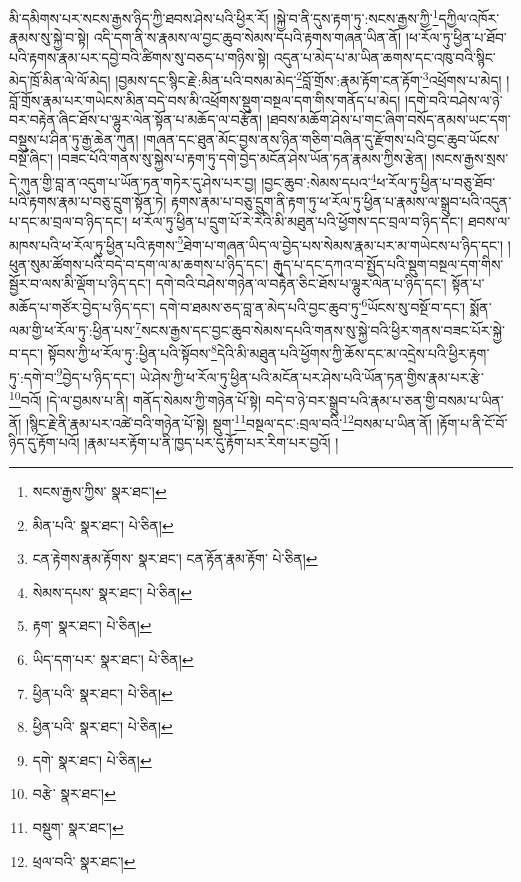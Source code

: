 མི་དམིགས་པར་སངས་རྒྱས་ཉིད་ཀྱི་ཐབས་ཤེས་པའི་ཕྱིར་རོ། །སྐྱེ་བ་ནི་དུས་རྟག་ཏུ་:སངས་རྒྱས་ཀྱི་\footnote{སངས་རྒྱས་ཀྱིས་  སྣར་ཐང་། }དཀྱིལ་འཁོར་རྣམས་སུ་སྐྱེ་བ་སྟེ། འདི་དག་ནི་ས་རྣམས་ལ་བྱང་ཆུབ་སེམས་དཔའི་རྟགས་གཞན་ཡིན་ནོ། །ཕ་རོལ་ཏུ་ཕྱིན་པ་ཐོབ་པའི་རྟགས་རྣམ་པར་དབྱེ་བའི་ཚིགས་སུ་བཅད་པ་གཉིས་སྟེ། འདུན་པ་མེད་པ་མ་ཡིན་ཆགས་དང་འཁུ་བའི་སྙིང་མེད་ཁྲོ་མིན་ལེ་ལོ་མེད། །བྱམས་དང་སྙིང་རྗེ་:མིན་པའི་བསམ་མེད་\footnote{མིན་པའི་  སྣར་ཐང་།  པེ་ཅིན། }བློ་གྲོས་:རྣམ་རྟོག་ངན་རྟོག་\footnote{ངན་རྟེགས་རྣམ་རྟོགས་  སྣར་ཐང་། ངན་རྟོན་རྣམ་རྟོག་  པེ་ཅིན། }འཕྲོགས་པ་མེད། །བློ་གྲོས་རྣམ་པར་གཡེངས་མིན་བདེ་བས་མི་འཕྲོགས་སྡུག་བསྔལ་དག་གིས་གནོད་པ་མེད། །དགེ་བའི་བཤེས་ལ་ཉེ་བར་བརྟེན་ཞིང་ཐོས་པ་ལྷུར་ལེན་སྟོན་པ་མཆོད་ལ་བརྩོན། །ཐབས་མཆོག་ཤེས་པ་གང་ཞིག་བསོད་ནམས་ཡང་དག་བསྡུས་པ་ཤིན་ཏུ་རྒྱ་ཆེན་ཀུན། །གཞན་དང་ཐུན་མོང་བྱས་ནས་ཉིན་གཅིག་བཞིན་དུ་རྫོགས་པའི་བྱང་ཆུབ་ཡོངས་བསྔོ་ཞིང་། །བཟང་པོའི་གནས་སུ་སྐྱེས་པ་རྟག་ཏུ་དགེ་བྱེད་མངོན་ཤེས་ཡོན་ཏན་རྣམས་ཀྱིས་རྩེན། །སངས་རྒྱས་སྲས་དེ་ཀུན་གྱི་བླ་ན་འདུག་པ་ཡོན་ཏན་གཏེར་དུ་ཤེས་པར་བྱ། །བྱང་ཆུབ་:སེམས་དཔའ་\footnote{སེམས་དཔས་  སྣར་ཐང་།  པེ་ཅིན། }ཕ་རོལ་ཏུ་ཕྱིན་པ་བཅུ་ཐོབ་པའི་རྟགས་རྣམ་པ་བཅུ་དྲུག་སྟོན་ཏེ། རྟགས་རྣམ་པ་བཅུ་དྲུག་ནི་རྟག་ཏུ་ཕ་རོལ་ཏུ་ཕྱིན་པ་རྣམས་ལ་སྒྲུབ་པའི་འདུན་པ་དང་མ་བྲལ་བ་ཉིད་དང་། ཕ་རོལ་ཏུ་ཕྱིན་པ་དྲུག་པོ་རེ་རེའི་མི་མཐུན་པའི་ཕྱོགས་དང་བྲལ་བ་ཉིད་དང་། ཐབས་ལ་མཁས་པའི་ཕ་རོལ་ཏུ་ཕྱིན་པའི་རྟགས་\footnote{རྟག་  སྣར་ཐང་།  པེ་ཅིན། }ཐེག་པ་གཞན་ཡིད་ལ་བྱེད་པས་སེམས་རྣམ་པར་མ་གཡེངས་པ་ཉིད་དང་། །ཕུན་སུམ་ཚོགས་པའི་བདེ་བ་དག་ལ་མ་ཆགས་པ་ཉིད་དང་། རྒུད་པ་དང་དཀའ་བ་སྤྱོད་པའི་སྡུག་བསྔལ་དག་གིས་སྦྱོར་བ་ལས་མི་ལྡོག་པ་ཉིད་དང་། དགེ་བའི་བཤེས་གཉེན་ལ་བརྟེན་ཅིང་ཐོས་པ་ལྷུར་ལེན་པ་ཉིད་དང་། སྟོན་པ་མཆོད་པ་གཙོར་བྱེད་པ་ཉིད་དང་། དགེ་བ་ཐམས་ཅད་བླ་ན་མེད་པའི་བྱང་ཆུབ་ཏུ་\footnote{ཡིད་དག་པར་  སྣར་ཐང་།  པེ་ཅིན། }ཡོངས་སུ་བསྔོ་བ་དང་། སྨོན་ལམ་གྱི་ཕ་རོལ་ཏུ་:ཕྱིན་པས་\footnote{ཕྱིན་པའི་  སྣར་ཐང་།  པེ་ཅིན། }སངས་རྒྱས་དང་བྱང་ཆུབ་སེམས་དཔའི་གནས་སུ་སྐྱེ་བའི་ཕྱིར་གནས་བཟང་པོར་སྐྱེ་བ་དང་། སྟོབས་ཀྱི་ཕ་རོལ་ཏུ་:ཕྱིན་པའི་སྟོབས་\footnote{ཕྱིན་པའི་  སྣར་ཐང་།  པེ་ཅིན། }དེའི་མི་མཐུན་པའི་ཕྱོགས་ཀྱི་ཆོས་དང་མ་འདྲེས་པའི་ཕྱིར་རྟག་ཏུ་:དགེ་བ་\footnote{དགེ་  སྣར་ཐང་།  པེ་ཅིན། }བྱེད་པ་ཉིད་དང་། ཡེ་ཤེས་ཀྱི་ཕ་རོལ་ཏུ་ཕྱིན་པའི་མངོན་པར་ཤེས་པའི་ཡོན་ཏན་གྱིས་རྣམ་པར་རྩེ་\footnote{བརྩེ་  སྣར་ཐང་། }བའོ། །དེ་ལ་བྱམས་པ་ནི། གནོད་སེམས་ཀྱི་གཉེན་པོ་སྟེ། བདེ་བ་ཉེ་བར་སྒྲུབ་པའི་རྣམ་པ་ཅན་གྱི་བསམ་པ་ཡིན་ནོ། །སྙིང་རྗེ་ནི་རྣམ་པར་འཚེ་བའི་གཉེན་པོ་སྟེ། སྡུག་\footnote{བསྡུག་  སྣར་ཐང་། }བསྔལ་དང་:བྲལ་བའི་\footnote{ཕྲལ་བའི་  སྣར་ཐང་། }བསམ་པ་ཡིན་ནོ། །རྟོག་པ་ནི་ངོ་བོ་ཉིད་དུ་རྟོག་པའོ། །རྣམ་པར་རྟོག་པ་ནི་ཁྱད་པར་དུ་རྟོག་པར་རིག་པར་བྱའོ། །
